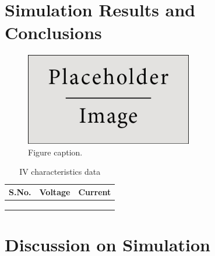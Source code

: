 \documentclass{article}
\begin{document}
    

\section{Simulation Results and Conclusions}



\begin{figure}[h]
\begin{center}
\includegraphics[width=0.65\textwidth]{placeholder} %
\caption{Figure caption.}
\end{center}
\end{figure}
\begin{table}[ht!]
\centering
\caption{IV characteristics data}
\vspace{0.5pt}
\label{tab:my-table}
\begin{tabular}{|l|l|l|}
\hline
S.No. & Voltage & Current \\ \hline
      &         &         \\ \hline
      &         &         \\ \hline
      &         &         \\ \hline
\end{tabular}
\end{table}



\section{Discussion on Simulation}
\end{document}
